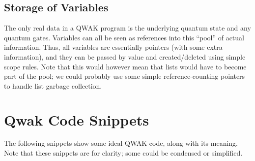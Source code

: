 \documentclass{article}
\begin{document}
\subsection{Storage of Variables}

The only real data in a QWAK program is the underlying quantum state and any quantum gates. Variables can all be seen as references into this “pool” of actual information. Thus, all variables are essentially pointers (with some extra information), and they can be passed by value and created/deleted using simple scope rules. Note that this would however mean that lists would have to become part of the pool; we could probably use some simple reference-counting pointers to handle list garbage collection.

\section{Qwak Code Snippets}
\label{sec:code-snippets}

The following snippets show some ideal QWAK code, along with its meaning. Note that these snippets are for clarity; some could be condensed or simplified.
\end{document}
